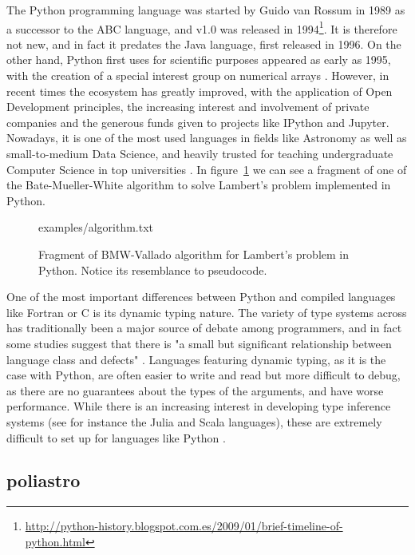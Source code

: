 The Python programming language was started by Guido van Rossum in 1989 as a successor to the ABC language, and v1.0 was released in 1994\footnote{\url{http://python-history.blogspot.com.es/2009/01/brief-timeline-of-python.html}}. It is therefore not new, and in fact it predates the Java language, first released in 1996. On the other hand, Python first uses for scientific purposes appeared as early as 1995, with the creation of a special interest group on numerical arrays \cite{millman2011python}. However, in recent times the ecosystem has greatly improved, with the application of Open Development principles, the increasing interest and involvement of private companies and the generous funds given to projects like IPython \cite{perez2007ipython} and Jupyter. Nowadays, it is one of the most used languages in fields like Astronomy \cite{momcheva2015software} as well as small-to-medium Data Science, and heavily trusted for teaching undergraduate Computer Science in top universities \cite{guo2014python}. In figure~\ref{fig:python} we can see a fragment of one of the Bate-Mueller-White algorithm to solve Lambert's problem implemented in Python.

\begin{figure}
\begin{lstinputlisting}[language=Python]{examples/algorithm.txt}
\end{lstinputlisting}
\caption{Fragment of BMW-Vallado algorithm for Lambert's problem in Python. Notice its resemblance to pseudocode.}
\label{fig:python}
\end{figure}

One of the most important differences between Python and compiled languages like Fortran or C is its dynamic typing nature. The variety of type systems across has traditionally been a major source of debate among programmers, and in fact some studies suggest that there is "a small but significant relationship between language class and defects" \cite{ray2014quality}. Languages featuring dynamic typing, as it is the case with Python, are often easier to write and read but more difficult to debug, as there are no guarantees about the types of the arguments, and have worse performance. While there is an increasing interest in developing type inference systems (see for instance the Julia and Scala languages), these are extremely difficult to set up for languages like Python \cite{cannon2005localized}.

\subsection{poliastro}

